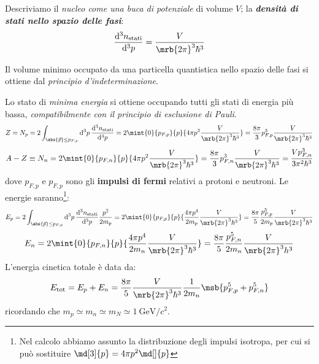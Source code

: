 Descriviamo il \textit{nucleo come una buca di potenziale} di volume $V$; la
\textit{\textbf{densità di stati nello spazio delle fasi}}:
\begin{equation}
	\frac{\mathrm{d}^{3} n_\text{stati}}{\mathrm{d}^{3} p}
	= \frac{V}{\mrb{2 \pi}^{3} \hbar^3}
\end{equation}
\begin{note}[]
  Il volume minimo occupato da una particella quantistica nello spazio delle
  fasi si ottiene dal \textit{principio d'indeterminazione}.
\end{note}
Lo stato di \textit{minima energia} si ottiene occupando tutti gli stati di
energia più bassa, \textit{compatibilmente con il principio di esclusione di
	Pauli}.
\begin{equation}
	Z
	= N_p
	= 2 \int_{\abs{\vec{p}}\leq p_{F,p}} \mathrm{d}^{3}
	p\,\frac{\mathrm{d}^{3} n_\text{stati}}{\mathrm{d}^{3} p}
	= 2 \mint{0}{p_{F,p}}{p}{4 \pi p^2 \frac{V}{\mrb{2 \pi}^{3} \hbar^3}}
	= \frac{8 \pi}{3} p _{F,p}^{3} \frac{V}{\mrb{2 \pi}^3 \hbar^3}
\end{equation}
\begin{equation}
	A - Z
	\equiv N_n
	= 2 \mint{0}{p _{F,n}}{p}{4 \pi p^2 \frac{V}{\mrb{2 \pi}^{3} \hbar^3}}
  = \frac{8 \pi}{3} p _{F,n}^{3} \frac{V}{\mrb{2 \pi}^{3} \hbar^3}
  = \frac{V p _{F, n}^3}{3 \pi^2 \hbar^3}
\end{equation}
dove $p_{F,p}$ e $p_{F,p}$ sono gli \textbf{impulsi di fermi} relativi
a protoni e neutroni.
Le energie saranno\footnote{
  Nel calcolo abbiamo assunto la distribuzione degli impulsi isotropa, per cui
  si può sostituire $\md[3]{p} = 4 \pi p^2 \md[]{p}$
}:
\begin{equation}
	E_p = 2 \int_{\abs{\vec{p}}\leq p_{F,p}} \mathrm{d}^{3}
	p\,\frac{\mathrm{d}^{3} n_\text{stati}}{\mathrm{d}^{3} p} \frac{p^{2}}{2 m_p}
	= 2 \mint{0}{p_{F,p}}{p}{\frac{4 \pi p^4}{2 m_p} \frac{V}{\mrb{2 \pi}^{3}
			\hbar^3}}
	= \frac{8 \pi}{5} \frac{p _{F,p}^{5}}{2 m_p} \frac{V}{\mrb{2 \pi}^3 \hbar^3}
\end{equation}
\begin{equation}
	E_n = 2 \mint{0}{p _{F,n}}{p}{\frac{4 \pi p^4}{2 m_n} \frac{V}{\mrb{2 \pi}^3
			\hbar^3}} = \frac{8 \pi}{5} \frac{p _{F,n}^{5}}{2 m_n} \frac{V}{\mrb{2
			\pi}^{3} h^3}
\end{equation}
L'energia cinetica totale è data da:
\begin{equation}
	E _\text{tot}
  = E_p + E_n
  = \frac{8 \pi}{5} \frac{V}{\mrb{2 \pi}^{3} \hbar^3}
	\frac{1}{2 m_n} \msb{p _{F,p}^{5} + p _{F, n}^{5}}
\end{equation}
ricordando che $m_p \simeq m_n \simeq m_N \simeq \SI{1}{\GeV \per c^2}$.


